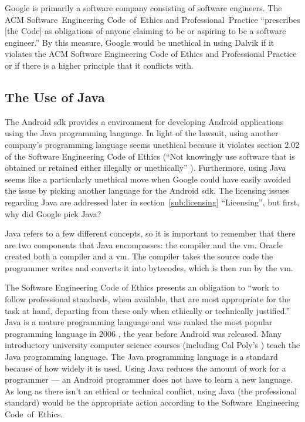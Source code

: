 \documentclass[11pt]{article}
\begin{document}
\begin{multicols}{2}
Google is primarily a software company consisting of software engineers.  The
ACM Software~Engineering Code~of~Ethics and Professional~Practice ``prescribes
[the Code] as obligations of anyone claiming to be or aspiring to be a software
engineer.'' \cite{secode} By this measure, Google would be unethical in using
Dalvik if it violates the ACM Software Engineering Code of Ethics and
Professional Practice or if there is a higher principle that it conflicts with.


\subsection{The Use of Java} %
\label{sub:java}

The Android \gls{sdk} provides a environment for developing Android applications
using the Java programming language. \cite{android-sdk-building}  In light of
the lawsuit, using another company's programming language seems unethical
because it violates section 2.02 of the Software Engineering Code of Ethics
(``Not knowingly use software that is obtained or retained either illegally or
unethically'' \cite[\S2.02]{secode}).  Furthermore, using Java seems like a
particularly unethical move when Google could have easily avoided the issue by
picking another language for the Android \gls{sdk}.  The licensing issues
regarding Java are addressed later in section~\ref{sub:licensing} ``Licensing'',
but first, why did Google pick Java?

Java refers to a few different concepts, so it is important to remember that
there are two components that Java encompasses: the compiler and the \gls{vm}.
Oracle created both a compiler and a \gls{vm}.  The compiler takes the source
code the programmer writes and converts it into \glspl{bytecode}, which is then
run by the \gls{vm}. \cite[Chapter 1]{javavm-bytecode}

The Software Engineering Code of Ethics presents an obligation to ``work to
follow professional standards, when available, that are most appropriate for the
task at hand, departing from these only when ethically or technically
justified.'' \cite[\S3.06]{secode}  Java is a mature programming language and
was ranked the most popular programming language in 2006 \cite[Long term
trends]{tiobe}, the year before Android was released.  Many introductory
university computer science courses (including Cal Poly's \cite[Textbooks]{csc102}) teach
the Java programming language.  The Java programming language is a standard
because of how widely it is used.  Using Java reduces the amount of work for a
programmer --- an Android programmer does not have to learn a new language.  As
long as there isn't an ethical or technical conflict, using Java (the
professional standard) would be the appropriate action according to the
Software~Engineering Code~of~Ethics.


\end{multicols}
\end{document}

